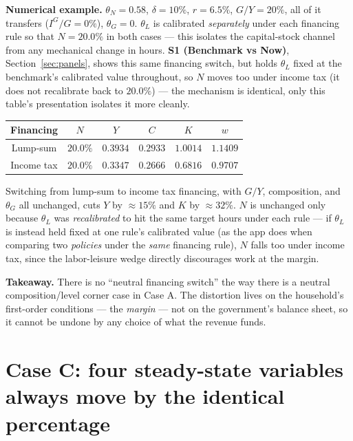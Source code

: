 \documentclass[11pt]{article}
\begin{document}
\begin{casebox}
\textbf{Numerical example.} $\theta_N=0.58$, $\delta=10\%$, $r=6.5\%$,
$G/Y=20\%$, all of it transfers ($I^G/G=0\%$), $\theta_G=0$. $\theta_L$ is
calibrated \emph{separately} under each financing rule so that $N=20.0\%$ in
both cases --- this isolates the capital-stock channel from any mechanical
change in hours. \textbf{S1 (Benchmark vs Now)}, Section~\ref{sec:panels},
shows this same financing switch, but holds $\theta_L$ fixed at the
benchmark's calibrated value throughout, so $N$ moves too under income tax
(it does not recalibrate back to $20.0\%$) --- the mechanism is identical,
only this table's presentation isolates it more cleanly.

\begin{center}
\begin{tabular}{cccccc}
\toprule
Financing & $N$ & $Y$ & $C$ & $K$ & $w$ \\
\midrule
Lump-sum   & $20.0\%$ & $0.3934$ & $0.2933$ & $1.0014$ & $1.1409$ \\
Income tax & $20.0\%$ & $0.3347$ & $0.2666$ & $0.6816$ & $0.9707$ \\
\bottomrule
\end{tabular}
\end{center}

Switching from lump-sum to income tax financing, with $G/Y$, composition,
and $\theta_G$ all unchanged, cuts $Y$ by $\approx 15\%$ and $K$ by
$\approx 32\%$. $N$ is unchanged only because $\theta_L$ was
\emph{recalibrated} to hit the same target hours under each rule --- if
$\theta_L$ is instead held fixed at one rule's calibrated value (as the app
does when comparing two \emph{policies} under the \emph{same} financing
rule), $N$ falls too under income tax, since the labor-leisure wedge
directly discourages work at the margin.
\end{casebox}

\begin{notebox}
\textbf{Takeaway.} There is no ``neutral financing switch'' the way there
is a neutral composition/level corner case in Case A. The distortion lives
on the household's first-order conditions --- the \emph{margin} --- not on
the government's balance sheet, so it cannot be undone by any choice of
what the revenue funds.
\end{notebox}

\section{Case C: four steady-state variables always move by the identical percentage}
\label{sec:caseC}
\end{document}
